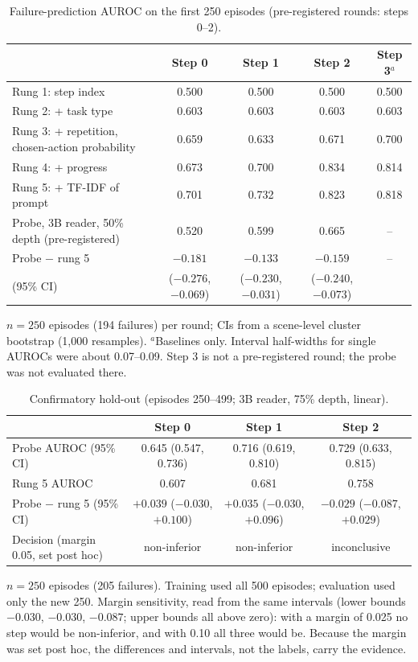 \documentclass[11pt]{article}
\begin{document}
\begin{table}[t]
\centering\small
\caption{Failure-prediction AUROC on the first 250 episodes (pre-registered rounds: steps 0--2).}\label{tab:ladder}
\begin{tabularx}{\linewidth}{@{}Lcccc@{}}
\toprule
 & Step 0 & Step 1 & Step 2 & Step 3$^{a}$ \\
\midrule
Rung 1: step index & 0.500 & 0.500 & 0.500 & 0.500 \\
Rung 2: + task type & 0.603 & 0.603 & 0.603 & 0.603 \\
Rung 3: + repetition, chosen-action probability & 0.659 & 0.633 & 0.671 & 0.700 \\
Rung 4: + progress & 0.673 & 0.700 & 0.834 & 0.814 \\
Rung 5: + TF-IDF of prompt & 0.701 & 0.732 & 0.823 & 0.818 \\
Probe, 3B reader, 50\% depth (pre-registered) & 0.520 & 0.599 & 0.665 & -- \\
\addlinespace
Probe $-$ rung 5 & $-0.181$ & $-0.133$ & $-0.159$ & -- \\
\quad (95\% CI) & ($-0.276$, $-0.069$) & ($-0.230$, $-0.031$) & ($-0.240$, $-0.073$) & \\
\bottomrule
\end{tabularx}
\par\smallskip\raggedright\footnotesize
$n = 250$ episodes (194 failures) per round; CIs from a scene-level cluster bootstrap (1,000 resamples). $^{a}$Baselines only. Interval half-widths for single AUROCs were about 0.07--0.09. Step 3 is not a pre-registered round; the probe was not evaluated there.
\end{table}

\begin{table}[t]
\centering\small
\caption{Confirmatory hold-out (episodes 250--499; 3B reader, 75\% depth, linear).}\label{tab:confirm}
\begin{tabularx}{\linewidth}{@{}Lccc@{}}
\toprule
 & Step 0 & Step 1 & Step 2 \\
\midrule
Probe AUROC (95\% CI) & 0.645 (0.547, 0.736) & 0.716 (0.619, 0.810) & 0.729 (0.633, 0.815) \\
Rung 5 AUROC & 0.607 & 0.681 & 0.758 \\
Probe $-$ rung 5 (95\% CI) & $+0.039$ ($-0.030$, $+0.100$) & $+0.035$ ($-0.030$, $+0.096$) & $-0.029$ ($-0.087$, $+0.029$) \\
Decision (margin 0.05, set post hoc) & non-inferior & non-inferior & inconclusive \\
\bottomrule
\end{tabularx}
\par\smallskip\raggedright\footnotesize
$n = 250$ episodes (205 failures). Training used all 500 episodes; evaluation used only the new 250. Margin sensitivity, read from the same intervals (lower bounds $-0.030$, $-0.030$, $-0.087$; upper bounds all above zero): with a margin of 0.025 no step would be non-inferior, and with 0.10 all three would be. Because the margin was set post hoc, the differences and intervals, not the labels, carry the evidence.
\end{table}
\end{document}
